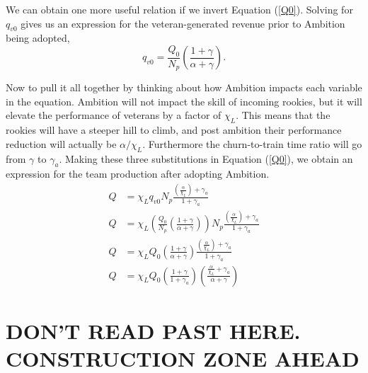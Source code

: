 \documentclass[paper=a4, fontsize=11pt abstract]{scrartcl}
\numberwithin{equation}{section}		%
\numberwithin{figure}{section}			%
\numberwithin{table}{section}				%
\begin{document}
We can obtain one more useful relation if we invert Equation (\ref{Q0}).  Solving for $q_{v0}$ gives us an expression for the veteran-generated revenue prior to Ambition being adopted,
\begin{equation}
    q_{v0} = \frac{Q_0}{N_p}\left(\frac{1 + \gamma}{\alpha + \gamma}\right).
\end{equation}

Now to pull it all together by thinking about how Ambition impacts each variable in the equation.  Ambition will not impact the skill of incoming rookies, but it will elevate the performance of veterans by a factor of $\chi_L$.  This means that the rookies will have a steeper hill to climb, and post ambition their performance reduction will actually be $\alpha / \chi_L$.  Furthermore the churn-to-train time ratio will go from $\gamma$ to $\gamma_a$.  Making these three substitutions in Equation (\ref{Q0}), we obtain an expression for the team production after adopting Ambition.
\begin{align}
    Q &= \chi_L q_{v0} N_p \frac{\left(\frac{\alpha}{\chi_L}\right) + \gamma_a}{1 + \gamma_a} \\
    Q &= \chi_L \left(     \frac{Q_0}{N_p}\left(\frac{1 + \gamma}{\alpha + \gamma}\right)             \right) N_p \frac{\left(\frac{\alpha}{\chi_L}\right) + \gamma_a}{1 + \gamma_a} \\
    Q &= \chi_L Q_0  \left(\frac{1 + \gamma}{\alpha + \gamma}  \right)  \frac{\left(\frac{\alpha}{\chi_L}\right) + \gamma_a}{1 + \gamma_a} \\
    Q &= \chi_L Q_0  \left(\frac{1+\gamma}{1 + \gamma_a}\right) \left(\frac{\frac{\alpha}{\chi_L} + \gamma_a  }{\alpha + \gamma}\right)
\end{align}

































\section{DON'T READ PAST HERE. CONSTRUCTION ZONE AHEAD}
\end{document}
